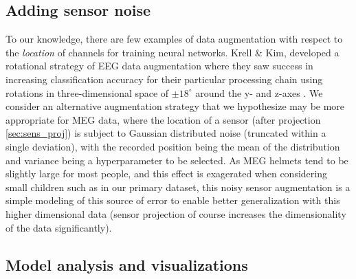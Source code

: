 \documentclass[fleqn,10pt]{wlscirep}
\begin{document}


\subsection*{Adding sensor noise}

To our knowledge, there are few examples of data augmentation with respect to the {\em location} of channels for training neural networks. Krell \& Kim, developed a rotational strategy of EEG data augmentation where they saw success in increasing classification accuracy for their particular processing chain using rotations in three-dimensional space of $\pm 18^{\circ}$ around the y- and z-axes \cite{Krell2017}. We consider an alternative augmentation strategy that we hypothesize may be more appropriate for MEG data, where the location of a sensor (after projection \ref{sec:sens_proj}) is subject to Gaussian distributed noise (truncated within a single deviation), with the recorded position being the mean of the distribution and variance being a hyperparameter to be selected. As MEG helmets tend to be slightly large for most people, and this effect is exagerated when considering small children such as in our primary dataset, this noisy sensor augmentation is a simple modeling of this source of error to enable better generalization with this higher dimensional data (sensor projection of course increases the dimensionality of the data significantly).

\subsection*{Model analysis and visualizations} \label{sec:max_act}
\end{document}
